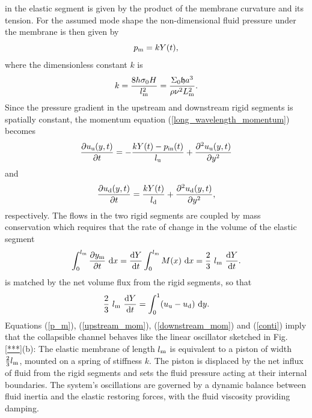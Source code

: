 \documentclass[aps,prl,reprint,superscriptaddress,floatfix]{revtex4-1}
\newcommand{\be}{\begin{equation}}
\newcommand{\ee}{\end{equation}}
\begin{document}
in the elastic segment is given by the product
of the membrane curvature and its tension. For the assumed mode shape
the non-dimensional fluid pressure under the membrane is then given by
\be
\label{p_m}
p_{\rm m} = k Y(t),
\ee
where the dimensionless constant $k$ is
\be
k = \frac{8 h \sigma_0 H}{l_{\rm m}^2}
= \frac{\Sigma_0 \mathfrak{h}a^3}{\rho \nu^2 L_{\rm m}^2}.
\ee
Since the pressure gradient in the upstream and downstream rigid
segments is spatially constant, the momentum equation
(\ref{long_wavelength_momentum}) becomes
\be
\label{upstream_mom}
\frac{\partial u_{\rm u}(y,t)}{\partial t} =
-\frac{k Y(t) - p_{\rm in}(t)}{l_{\rm u}} +
\frac{\partial^2 u_{\rm u}(y,t)}{\partial y^2}
\ee
and
\be
\label{downstream_mom}
\frac{\partial u_{\rm d}(y,t)}{\partial t} =
\frac{k Y(t)}{l_{\rm d}} +
\frac{\partial^2 u_{\rm d}(y,t)}{\partial y^2},
\ee
respectively.
The flows in the two rigid segments are coupled by
mass conservation which requires that the
rate of change in the volume of the elastic segment
\be
\int_0^{l_{\rm m}} \frac{\partial y_{\rm m}}{\partial t} \ {\rm d}x =
\frac{{\rm d}Y}{{\rm d}t} \int_0^{l_{\rm m}} M(x) \ {\rm d}x  = 
\frac{2}{3} \ l_{\rm m} \ \frac{{\rm d}Y}{{\rm d}t}.
\ee
is matched by the net volume flux from the rigid segments, so that
\be
\label{conti}
\frac{2}{3} \ l_{\rm m}  \ \frac{{\rm d}Y}{{\rm d}t}
= \int_0^1  (u_{\rm u} - u_{\rm d} ) \ {\rm d}y.
\ee
Equations (\ref{p_m}), (\ref{upstream_mom}), (\ref{downstream_mom})
and (\ref{conti}) imply that the collapsible
channel behaves like the linear oscillator sketched in 
Fig. \ref{***}(b): The elastic membrane of length $l_{\rm m}$
is equivalent to a piston of width $\frac{2}{3}l_{\rm m}$, mounted on a spring
of stiffness $k$. The piston is displaced by the net influx of
fluid from the rigid segments and sets the fluid pressure acting at
their internal boundaries. The system's oscillations are
governed by a dynamic balance between fluid inertia and the
elastic restoring forces, with the fluid viscosity providing
damping.
\end{document}
